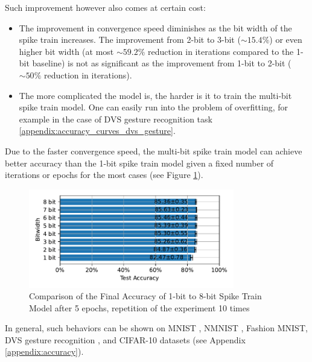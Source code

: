         Such improvement however also comes at certain cost:
        \begin{itemize}
            \item The improvement in convergence speed diminishes as the bit width of the spike train increases. The improvement from 2-bit to 3-bit ($\sim 15.4\%$) or even higher bit width (at most $\sim 59.2\%$ reduction in iterations compared to the 1-bit baseline) is not as significant as the improvement from 1-bit to 2-bit ($\sim 50\%$ reduction in iterations).
            \item The more complicated the model is, the harder is it to train the multi-bit spike train model. One can easily run into the problem of overfitting, for example in the case of DVS gesture recognition task \ref{appendix:accuracy_curves_dvs_gesture}.
        \end{itemize}

        Due to the faster convergence speed, the multi-bit spike train model can achieve better accuracy than the 1-bit spike train model given a fixed number of iterations or epochs for the most cases (see Figure \ref{fig:final_accuracy}).
        \begin{figure}[!htpb]
            \centering
            \includegraphics[width=0.8\textwidth]{../standard/FashionMNIST/plots/fashionmnist_final_acc.pdf}
            \caption{Comparison of the Final Accuracy of 1-bit to 8-bit Spike Train Model after 5 epochs, repetition of the experiment 10 times}
            \label{fig:final_accuracy}
        \end{figure}

        In general, such behaviors can be shown on MNIST \cite{deng2012mnist}, NMNIST \cite{10.3389/fnins.2015.00437}, Fashion MNIST, DVS gesture recognition \cite{8100264}, and CIFAR-10 datasets (see Appendix \ref{appendix:accuracy}).

